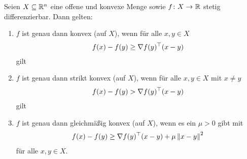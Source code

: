 
\begin{satz}
	Seien $X \subseteq \mathbb{R}^n$ eine offene und konvexe Menge sowie $\abb{f}{X}{\R}$ stetig differenzierbar. Dann gelten:
	\begin{enumerate}[leftmargin=*, label=(\roman*)]
		\item $f$ ist genau dann konvex (auf $X$), wenn für alle $x,y \in X$ 
		\begin{align} \label{eq: satz_konvex}
			f(x) - f(y) \geq \nabla f(y)^{\top} (x-y)
		\end{align}
		gilt
		\item $f$ ist genau dann strikt konvex (auf $X$), wenn für alle $x,y \in X$ mit $x \neq y$ 
		\begin{align} \label{eq: satz_streng_konvex}
		f(x) - f(y) > \nabla f(y)^{\top} (x-y)
		\end{align}
		gilt
		\item $f$ ist genau dann gleichmäßig konvex (auf $X$), wenn es ein $\mu > 0$ gibt mit
		\begin{align} \label{eq: satz_gleichmaessig_konvex}
		f(x) - f(y) \geq \nabla f(y)^{\top} (x-y) + \mu \left\lVert x-y \right\rVert^2
		\end{align}
		für alle $x,y \in X$.
	\end{enumerate}
\end{satz}
